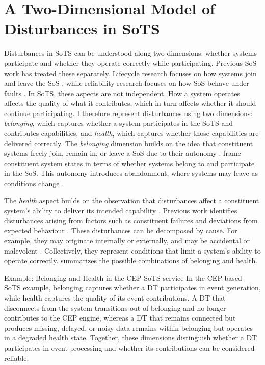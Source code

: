 \section{A Two-Dimensional Model of Disturbances in SoTS}
\label{sec:two-dimensional-disturbances}
Disturbances in SoTS can be understood along two dimensions: whether systems participate and whether they operate correctly while participating. Previous SoS work has treated these separately. Lifecycle research focuses on how systems join and leave the SoS \cite{axelsson2019refined,svenson2020situation,hristozov2023modeling}, while reliability research focuses on how SoS behave under faults \cite{ferreira2021reliability, uday2015designing,garro2014reliability,li2025reliability}. In SoTS, these aspects are not independent. How a system operates affects the quality of what it contributes, which in turn affects whether it should continue participating. I therefore represent disturbances using two dimensions: \emph{belonging}, which captures whether a system participates in the SoTS and contributes capabilities, and \emph{health}, which captures whether those capabilities are delivered correctly. The \emph{belonging} dimension builds on the idea that constituent systems freely join, remain in, or leave a SoS due to their autonomy \cite{salado2015abandonment}. \citet{axelsson2019refined} frame constituent system states in terms of whether systems belong to and participate in the SoS. This autonomy introduces abandonment, where systems may leave as conditions change \cite{salado2016exile,baldwin2011formation}.



The \emph{health} aspect builds on the observation that disturbances affect a constituent system's ability to deliver its intended capability \cite{ferreira2023towards}. Previous work identifies disturbances arising from factors such as constituent failures and deviations from expected behaviour \cite{ferreira2021reliability, ferreira2024framework}. These disturbances can be decomposed by cause. For example, they may originate internally or externally, and may be accidental or malevolent \cite{ferreira2023towards}. Collectively, they represent conditions that limit a system's ability to operate correctly.
 summarizes the possible combinations of belonging and health.


\begin{runningexample}{Example: Belonging and Health in the CEP SoTS service}
In the CEP-based SoTS example, belonging captures whether a DT participates in event generation, while health captures the quality of its event contributions. A DT that disconnects from the system transitions out of belonging and no longer contributes to the CEP engine, whereas a DT that remains connected but produces missing, delayed, or noisy data remains within belonging but operates in a degraded health state. Together, these dimensions distinguish whether a DT participates in event processing and whether its contributions can be considered reliable.
\end{runningexample}



